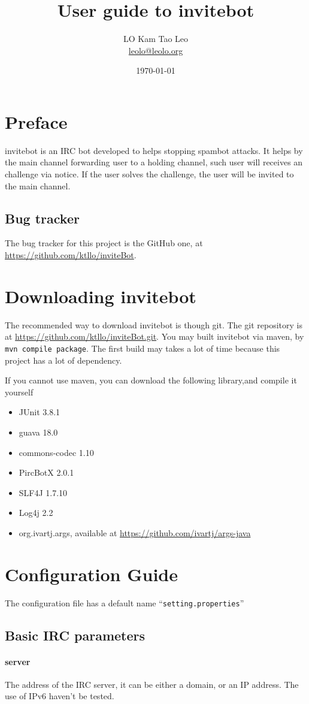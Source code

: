 \documentclass[a4paper,12pt,titlepage]{article}
\title{User guide to invitebot}
\author{LO Kam Tao Leo\\\href{mailto:leolo@leolo.org}{leolo@leolo.org}}
\date{\today}
\begin{document}
	\maketitle
\tableofcontents\newpage
\section{Preface}
invitebot is an IRC bot developed to helps stopping spambot attacks. It helps by the main channel forwarding user to a holding channel, such user will receives an challenge via notice. If the user solves the challenge, the user will be invited to the main channel.
\subsection{Bug tracker}
The bug tracker for this project is the GitHub one, at \url{https://github.com/ktllo/inviteBot}.
\section{Downloading invitebot}
The recommended way to download invitebot is though git. The git repository is at \url{https://github.com/ktllo/inviteBot.git}. You may built invitebot via maven, by \texttt{mvn compile package}. The first build may takes a lot of time because this project has a lot of dependency.

If you cannot use maven, you can download the following library,and compile it yourself
\begin{itemize}
	\item JUnit 3.8.1
	\item guava 18.0
	\item commons-codec 1.10
	\item PircBotX 2.0.1
	\item SLF4J 1.7.10
	\item Log4j 2.2
	\item org.ivartj.args, available at \url{https://github.com/ivartj/args-java}
\end{itemize}
\section{Configuration Guide}
The configuration file has a default name ``\texttt{setting.properties}''
\subsection{Basic IRC parameters}
\paragraph{server} The address of the IRC server, it can be either a domain, or an IP address. The use of IPv6 haven't be tested.
\end{document}
